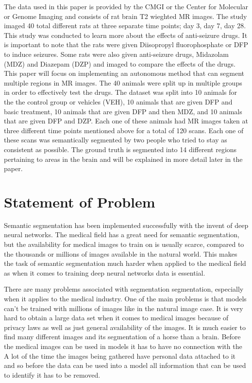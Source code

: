         
        The data used in this paper is provided by the CMGI or the Center for Molecular or Genome Imaging and consists of rat brain T2 wieghted MR images. 
        The study imaged 40 total different rats at three separate time points; day 3, day 7, day 28. 
        This study was conducted to learn more about the effects of anti-seizure drugs.
        It is important to note that the rats were given Diisopropyl fluorophosphate or DFP to induce seizures. 
        Some rats were also given anti-seizure drugs, Midazolam (MDZ) and Diazepam (DZP) and imaged to compare the effects of the drugs.
        This paper will focus on implementing an autonomous method that can segment multiple regions in MR images. 
        The 40 animals were split up in multiple groups in order to effectively test the drugs.
        The dataset was split into 10 animals for the the control group or vehicles (VEH), 10 animals that are given DFP and basic treatment, 10 animals that are given DFP and then MDZ, and 10 animals that are given DFP and DZP. 
        Each one of these animals had MR images taken at three different time points mentioned above for a total of 120 scans. 
        Each one of these scans was semantically segmented by two people who tried to stay as consistent as possible. 
        The ground truth is segmented into 14 different regions pertaining to areas in the brain and will be explained in more detail later in the paper. 
        
\section{Statement of Problem} 


    Semantic segmentation has been implemented successfully with the invent of deep neural networks.
    The medical field has a great need for semantic segmentation, but the availability for medical images to train on is usually scarce, compared to the thousands or millions of images available in the natural world.
    This makes the task of semantic segmentation much harder when applied to the medical field as when it comes to training deep neural networks data is essential. 
    
    There are many problems associated with segmentation segmentation, especially when it applies to the medical industry. 
    One of the main problems is that models can't be trained with millions of images like in the natural image case. 
    It is very hard to obtain a large data set when it comes to medical images because of privacy laws as well as just general availability of the images. 
    It is much easier to find many different images and its segmentation of a horse than a brain. 
    Before the medical images can be used in models it has to have no connection with the 
    A lot of the time the images being gathered have personal data attached to it and so before the data can be used into a model all information that can be used to identify it has to be removed. 
    
